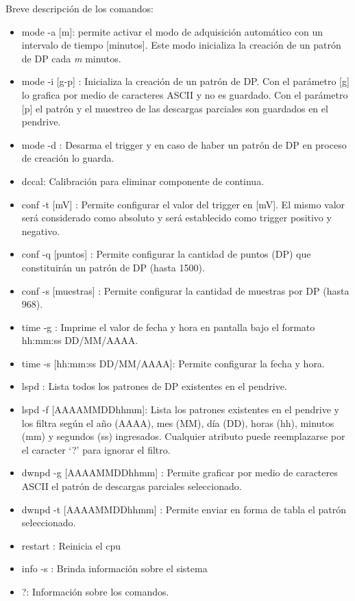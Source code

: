 \vspace{5mm}

Breve descripción de los comandos:
\begin{itemize}
\item mode -a [m]: permite activar el modo de adquisición automático con un intervalo de tiempo [minutos]. Este modo inicializa la creación de un patrón de DP cada \textit{m} minutos.
\item mode -i [g-p] : Inicializa la creación de un patrón de DP. Con el parámetro [g] lo grafica por medio de caracteres ASCII y no es guardado. Con el parámetro [p] el patrón y el muestreo de las descargas parciales son guardados en el pendrive.
\item mode -d : Desarma el trigger y en caso de haber un patrón de DP en proceso de creación lo guarda.
\item dccal: Calibración para eliminar componente de continua.
\item conf -t [mV] : Permite configurar el valor del trigger en [mV]. El mismo valor será considerado como absoluto y será establecido como trigger positivo y negativo.
\item conf -q [puntos] : Permite configurar la cantidad de puntos (DP) que constituirán un patrón de DP (hasta 1500). 
\item conf -s [muestras] : Permite configurar la cantidad de muestras por DP (hasta 968).
\item time -g : Imprime el valor de fecha y hora en pantalla bajo el formato hh:mm:ss DD/MM/AAAA.
\item time -s [hh:mm:ss DD/MM/AAAA]: Permite configurar la fecha y hora.
\item lspd : Lista todos los patrones de DP existentes en el pendrive.
\item lspd -f [AAAAMMDDhhmm]:  Lista los patrones existentes en el pendrive y los filtra según el año (AAAA), mes (MM), día (DD), horas (hh), minutos (mm) y segundos (ss) ingresados. Cualquier atributo puede reemplazarse por el caracter ‘?’ para ignorar el filtro.
\item dwnpd -g [AAAAMMDDhhmm] : Permite graficar por medio de caracteres ASCII el patrón de descargas parciales seleccionado.
\item dwnpd -t [AAAAMMDDhhmm] : Permite enviar en forma de tabla el patrón seleccionado.
\item restart : Reinicia el cpu
\item info -s : Brinda información sobre el sistema
\item ?: Información sobre los comandos.
\end{itemize}

